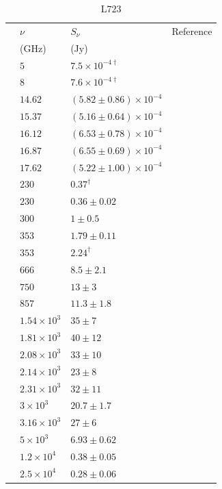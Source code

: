\documentclass[9pt]{extarticle}   	%
\begin{document}
\clearpage



\begin{table}
\caption{L$723$}
\begin{center}
\begin{tabular}{llll}
\hline
 & $\nu$ & $S_\nu$ & Reference\\
 & (GHz) & (Jy) & \\
\hline
 & $5$ & $7.5\times10^{-4\dag}$ & \citet{1996ApJ...473L.123A}\\
 & $8$ & $7.6\times10^{-4\dag}$ & \citet{1996ApJ...473L.123A}\\
 & $14.62$ & $(5.82\pm0.86)\times10^{-4}$ & \citet{2012MNRAS.423.1089A}\\
 & $15.37$ & $(5.16\pm0.64)\times10^{-4}$ & \citet{2012MNRAS.423.1089A}\\
 & $16.12$ & $(6.53\pm0.78)\times10^{-4}$ & \citet{2012MNRAS.423.1089A}\\
 & $16.87$ & $(6.55\pm0.69)\times10^{-4}$ & \citet{2012MNRAS.423.1089A}\\
 & $17.62$ & $(5.22\pm1.00)\times10^{-4}$ & \citet{2012MNRAS.423.1089A}\\
 & $230$ & $0.37^{\dag}$ & \citet{2001AA...365..440M}\\
 & $230$ & $0.36\pm0.02$ & \citet{1993AA...273..221R}\\
 & $300$ & $1\pm0.5$ & \citet{1993AA...273..221R}\\
 & $353$ & $1.79\pm0.11$ & \citet{2000ApJS..131..249S}\\
 & $353$ & $2.24^{\dag}$ & \citet{2008ApJS..175..277D}\\
 & $666$ & $8.5\pm2.1$ & \citet{2000ApJS..131..249S}\\
 & $750$ & $13\pm3$ & \citet{1993AA...273..221R}\\
 & $857$ & $11.3\pm1.8$ & \citet{2007AJ....133.1560W}\\
 & $1.54\times10^{3}$ & $35\pm7$ & \citet{1993AA...273..221R}\\
 & $1.81\times10^{3}$ & $40\pm12$ & \citet{1993AA...273..221R}\\
 & $2.08\times10^{3}$ & $33\pm10$ & \citet{1993AA...273..221R}\\
 & $2.14\times10^{3}$ & $23\pm8$ & \citet{1993AA...273..221R}\\
 & $2.31\times10^{3}$ & $32\pm11$ & \citet{1993AA...273..221R}\\
 & $3\times10^{3}$ & $20.7\pm1.7$ & \citet{2000ApJS..131..249S}\\
 & $3.16\times10^{3}$ & $27\pm6$ & \citet{2000ApJS..131..249S}\\
 & $5\times10^{3}$ & $6.93\pm0.62$ & \citet{2000ApJS..131..249S}\\
 & $1.2\times10^{4}$ & $0.38\pm0.05$ & \citet{2000ApJS..131..249S}\\
 & $2.5\times10^{4}$ & $0.28\pm0.06$ & \citet{2000ApJS..131..249S}\\
\end{tabular}
\end{center}
\label{default}
\end{table}%
\end{document}
